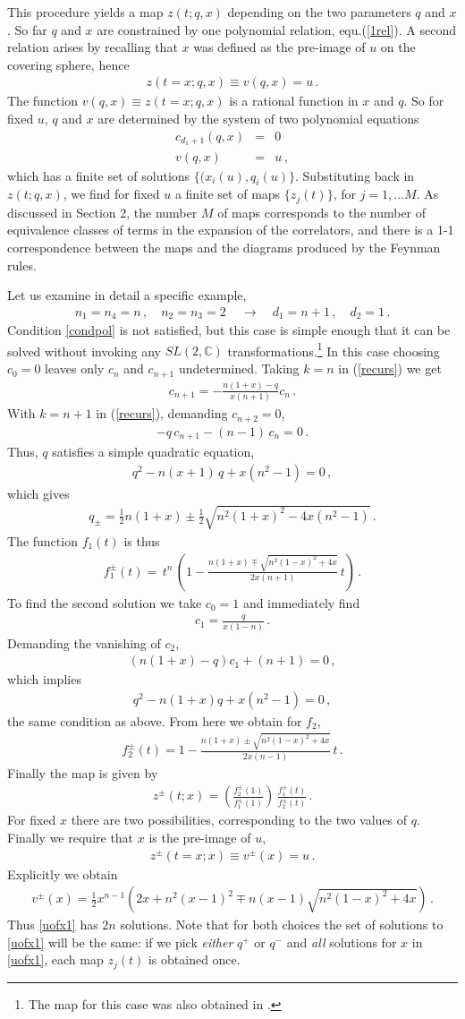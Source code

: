 \documentclass[letterpaper]{JHEP3}
\def\half{{\frac12}}
\def\be{\begin{equation}}
\def\ee{\end{equation}}
\def\be{\begin{eqnarray}}
\def\ee{\end{eqnarray}}
\begin{document}
This procedure yields a map $z(t ; q,x)$ depending on the two parameters $q$ and $x$. So far
  $q$ and $x$ are constrained by one polynomial relation, equ.(\ref{1rel}). A second relation
  arises by recalling
that $x$ was defined as the pre-image of $u$ on the covering sphere, hence
\be\label{2rel}
 z(t=x; q,x)  \equiv v(q,x) = u \, .
\ee 
The function $v(q,x ) \equiv z(t=x; q,x)$ is a rational function in $x$ and $q$.  So for fixed $u$,
 $q$ and $x$ are determined by the system of  two polynomial equations
\begin{eqnarray}\label{3rel}
c_{d_1+1} (q,x) & = & 0 \\
v(q,x ) & = & u \, , \nonumber
\end{eqnarray}
which has a finite set of solutions $\{ (x_i(u), q_i(u) \}$. Substituting back in $z(t; q, x)$, we
find for fixed $u$
a finite set of maps $\{ z_j (t) \}$, for $j=1, \dots M$. As discussed in Section 2, the number $M$ of maps
corresponds to the number of equivalence classes of terms in the expansion of the correlators, and there is
a 1-1 correspondence between the maps and the diagrams produced by the Feynman rules.


Let us examine in detail a specific example,
\be
n_1=n_4=n\, ,\quad n_2=n_3=2 \,\quad  \longrightarrow \quad d_1=n+1\,, \quad d_2=1 \,.
\ee 
Condition \eqref{condpol} is not satisfied,
 but  this case is simple enough that it can be  solved without invoking any $SL(2,\mathbb{C})$ transformations.\footnote{The map for this case was also
obtained in \cite{Lunin:2000yv}.}  In this case choosing $c_0=0$ leaves only $c_{n}$ and $c_{n+1}$ undetermined. Taking $k=n$ in (\ref{recurs})
we get
\be
c_{n+1}=-\frac{n(1+x)-q}{x(n+1)}c_n \,.
\ee With $k=n+1$ in (\ref{recurs}), demanding  $c_{n+2}=0$,
\be
-q\,c_{n+1}-(n-1)\,c_{n}=0 \,.
\ee Thus,  $q$ satisfies a simple quadratic equation,
\be \label{qquadratic}
q^2-n(x+1)\,q+x(n^2-1)=0 \, ,
\ee 
which gives
\be
q_\pm =\half n (1+x) \pm \half\sqrt{n^2(1+x)^2-4x(n^2-1)} \,.
\ee 
The function $f_1(t)$ is thus
\be
f_1^{\pm}(t)=\,t^n\,\left(1-\frac{n(1+x)\mp \sqrt{n^2 (1-x)^2 + 4 x}}{2x(n+1)}\,t\right) \,.
\ee To find the second solution we take $c_0=1$ and immediately find
\be
c_1=\frac{q}{x(1-n)} \,.
\ee Demanding the vanishing of $c_2$,
\be
(n(1+x)-q)c_1+(n+1)=0 \, ,
\ee which implies
\be
q^2-n(1+x)q+x(n^2-1)=0 \, ,
\ee the same condition as above. From here we obtain for $f_2$,
\be
f_2^{\pm}(t)=1-\frac{n(1+x)\pm \sqrt{n^2 (1-x)^2 + 4 x}}{2x(n-1)}\,t \,.
\ee Finally the map is given by
\be
z^\pm(t; x)=\left(\frac{f_2^\pm(1)}{f_1^\pm(1)}\right)\,\frac{f_1^\pm(t)}{f_2^\pm(t)} \,.
\ee  
For fixed $x$ there are two possibilities, corresponding to the two values of $q$.
Finally we require that $x$  is the pre-image of $u$,
\be\label{uofx1}
z^\pm(t=x; x) \equiv v^\pm(x)=u \, .
\ee 
Explicitly we obtain
\be
v^\pm(x)=
\half x^{n-1} \left(2 x + n^2 (x-1)^2  \mp n(x-1) \sqrt{n^2 (1-x)^2 + 4 x}\right) \,.
\ee Thus  \eqref{uofx1} has $2n$ solutions. Note that 
 for both choices the set of solutions to \eqref{uofx1}
will be the same: if we pick {\it either} $q^+$ or $q^-$ 
and  {\it all}  solutions for $x$ in \eqref{uofx1}, each map $z_j(t)$ is obtained once.
\end{document}
